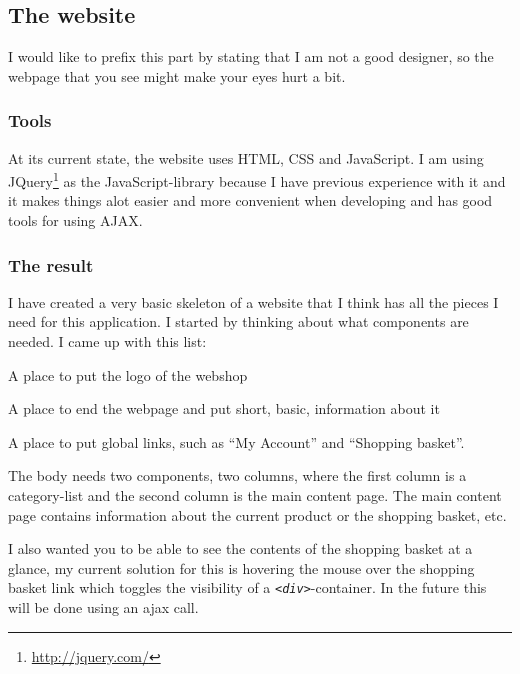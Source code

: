 \documentclass[12pt, a4paper,titlepage]{article}
\begin{document}
\subsection{The website}
I would like to prefix this part by stating that I am not a good designer,
so the webpage that you see might make your eyes hurt a bit.

\subsubsection{Tools}
At its current state, the website uses HTML, CSS and JavaScript. 
I am using JQuery\footnote{\url{http://jquery.com/}} as the JavaScript-library
because I have previous experience with it and it makes things alot easier and
more convenient when developing and has good tools for using AJAX.

\subsubsection{The result}

I have created a very basic skeleton of a website that I think has all the pieces
I need for this application. I started by thinking about what components are
needed. I came up with this list:
\begin{description}
\setlength\itemsep{-5pt}
\item[Header] A place to put the logo of the webshop
\item[Footer] A place to end the webpage and put short, basic, information
		about it
\item[Navigation] A place to put global links, such as ``My Account'' and ``Shopping basket''.
\item[Body] The body needs two components, two columns, where the first
	column is a category-list and the second column is the main content page.
	The main content page contains information about the current product
	or the shopping basket, etc.
\end{description}

I also wanted you to be able to see the contents of the shopping basket at a
glance, my current solution for this is hovering the mouse over the shopping
basket link which toggles the visibility of a \emph{\lstinline{<div>}}-container.
In the future this will be done using an ajax call.
\end{document}
